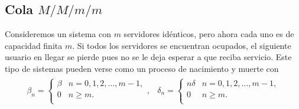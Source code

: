 \documentclass{article}
\numberwithin{equation}{section}
\begin{document}
\subsection*{Cola $M/M/m/m$}

Consideremos un sistema con $m$ servidores id\'enticos, pero ahora cada uno es de capacidad finita $m$. Si todos los servidores se encuentran ocupados, el siguiente usuario en llegar se pierde pues no se le deja esperar a que reciba servicio. Este tipo de sistemas pueden verse como un proceso de nacimiento y muerte con
\begin{eqnarray}
\begin{array}{ll}
\beta_{n}=\left\{\begin{array}{cc}
\beta & n=0,1,2,\ldots,m-1,\\
0 & n\geq m.\\
\end{array}
\right.,&
\delta_{n}=\left\{\begin{array}{cc}
n\delta & n=0,1,2,\ldots,m-1,\\
0 & n\geq m.\\
\end{array}
\right.
\end{array}
\end{eqnarray}
\end{document}
